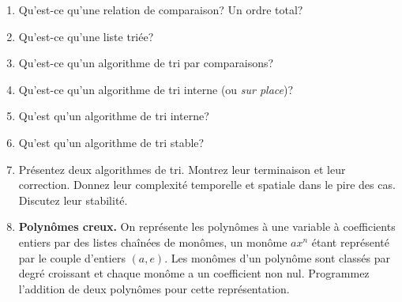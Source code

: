   \begin{enumerate}

    \item Qu'est-ce qu'une relation de comparaison? Un ordre total?

    \item Qu'est-ce qu'une liste triée?

    \item Qu'est-ce qu'un algorithme de tri par comparaisons?

    \item Qu'est-ce qu'un algorithme de tri interne (ou \emph{sur
      place})?

    \item Qu'est qu'un algorithme de tri interne?

    \item Qu'est qu'un algorithme de tri stable?

    \item Présentez deux algorithmes de tri. Montrez leur terminaison
      et leur correction. Donnez leur complexité temporelle et
      spatiale dans le pire des cas. Discutez leur stabilité.

    \item \textbf{Polynômes creux.} On représente les polynômes à une
      variable à coefficients entiers par des listes chaînées de
      monômes, un monôme \(a x^{n}\) étant représenté par le couple
      d'entiers \((a,e)\). Les monômes d'un polynôme sont classés par
      degré croissant et chaque monôme a un coefficient non
      nul. Programmez l'addition de deux polynômes pour cette
      représentation.

  \end{enumerate}
